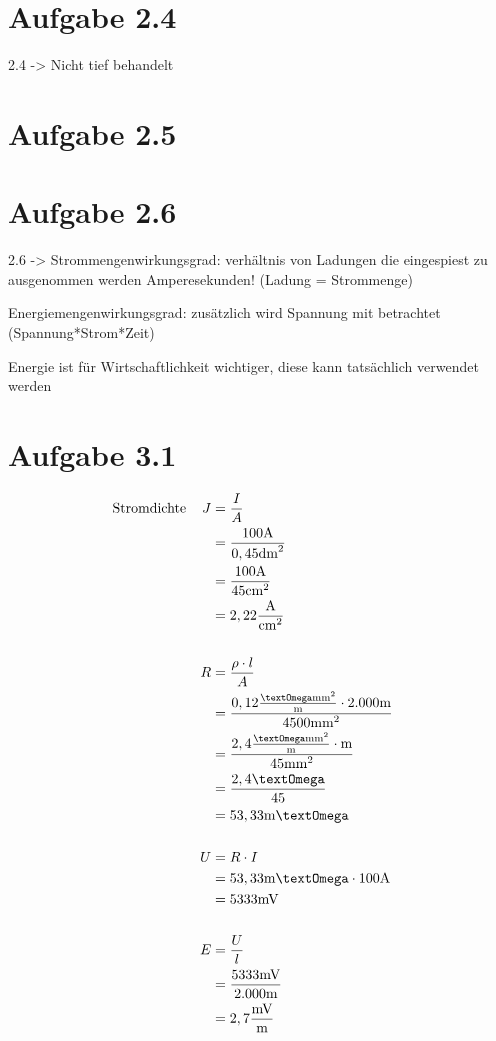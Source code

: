 \documentclass[]{article}
\newcommand{\unit}[1]{\text{#1}}
\newcommand{\fracunit}[2]{\frac{\unit{#1}}{\unit{#2}}}
\newcommand{\textsq}[1]{\ensuremath{\text{#1}^2}}
\begin{document}
\section*{Aufgabe 2.4}
\par
	2.4 -> Nicht tief behandelt

\section*{Aufgabe 2.5}
\par
\section*{Aufgabe 2.6}
\par
	2.6 -> Strommengenwirkungsgrad: verhältnis von Ladungen die eingespiest zu ausgenommen werden Amperesekunden! (Ladung = Strommenge)

	Energiemengenwirkungsgrad: zusätzlich wird Spannung mit betrachtet (Spannung*Strom*Zeit)

	Energie ist für Wirtschaftlichkeit wichtiger, diese kann tatsächlich verwendet werden

\section*{Aufgabe 3.1}
\par
	\begin{align*}
		&\text{Stromdichte}& J &= \frac{I}{A} &&\\
		&& &= \frac{100\unit{A}}{0,45\unit{\textsq{dm}}} &&\\
		&& &= \frac{100\unit{A}}{45\unit{\textsq{cm}}} &&\\
		&& &= 2,22\fracunit{A}{\textsq{cm}} &&\\
		\\
		&& R &= \frac{\rho \cdot l}{A} &&\\
		&&  &= \frac{0,12 \fracunit{\textOmega\textsq{mm}}{m} \cdot 2.000\unit{m}}{4500\unit{\textsq{mm}}} &&\\
		&&  &= \frac{2,4 \fracunit{\textOmega\textsq{mm}}{m} \cdot \unit{m}}{45\unit{\textsq{mm}}} &&\\
		&&  &= \frac{2,4 \unit{\textOmega}}{45} &&\\
		&&  &= 53,33 \unit{m\textOmega}&&\\
		\\
		&& U &= R \cdot I &&\\
		&&  &= 53,33 \unit{m\textOmega} \cdot 100\unit{A} &&\\
		&&  &= 5333 \unit{mV}&&\\
		\\
		&& E &= \frac{U}{l} &&\\
		&&  &= \frac{5333 \unit{mV}}{2.000 \unit{m}} &&\\
		&&  &= 2,7\fracunit{mV}{m} &&\\
	\end{align*}
\end{document}
